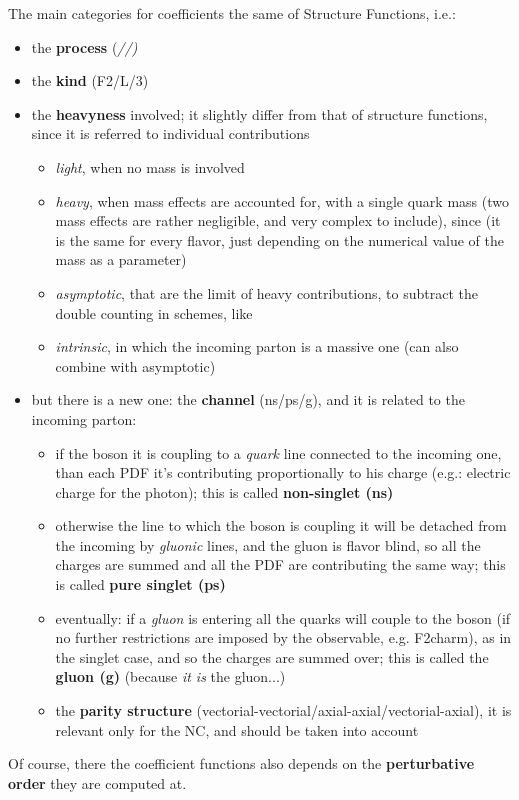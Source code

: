The main categories for coefficients the same of Structure Functions, i.e.:
\begin{itemize}
\item the \textbf{process} (\em/\nc/\cc)
\item the \textbf{kind} (F2/L/3)
\item the \textbf{heavyness} involved; it slightly differ from that of
  structure functions, since it is referred to individual contributions
  \begin{itemize}
    \item \textit{light}, when no mass is involved
    \item \textit{heavy}, when mass effects are accounted for, with a single
      quark mass (two mass effects are rather negligible, and very complex to
      include), since (it is the same for every flavor, just depending on the
      numerical value of the mass as a parameter)
    \item \textit{asymptotic}, that are the limit of heavy contributions, to
      subtract the double counting in \gmvfns schemes, like \fonll
    \item \textit{intrinsic}, in which the incoming parton is a massive one
      (can also combine with asymptotic)
  \end{itemize}
\item but there is a new one: the \textbf{channel} (ns/ps/g), and it is related to the
  incoming parton:
  \begin{itemize}
    \item if the \ew boson it is coupling to a \textit{quark} line connected to the incoming
      one, than each PDF it's contributing proportionally to his charge (e.g.:
      electric charge for the photon); this is called \textbf{non-singlet (ns)}
    \item otherwise the line to which the \ew boson is coupling it will be detached
      from the incoming  by \textit{gluonic} lines, and the gluon is flavor blind, so
      all the charges are summed and all the PDF are contributing the same way;
      this is called \textbf{pure singlet (ps)}
    \item eventually: if a \textit{gluon} is entering all the quarks will couple to the \ew
      boson (if no further restrictions are imposed by the observable, e.g.
      F2charm), as in the singlet case, and so the charges are summed over; this
      is called the \textbf{gluon (g)} (because \textit{it is} the gluon...)
    \item the \textbf{parity structure}
      (vectorial-vectorial/axial-axial/vectorial-axial), it is relevant only for
      the NC, and should be taken into account
  \end{itemize}
\end{itemize}
Of course, there the coefficient functions also depends on the
\textbf{perturbative order} they are computed at.

